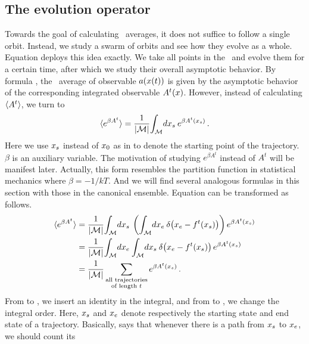 \subsection{The evolution operator}
\label{sec:eo}

Towards the goal of calculating \spt\ averages, it does not suffice to
follow a single orbit. Instead, we study a swarm of orbits and see how
they evolve as a whole.
Equation  deploys this idea exactly. We take all
points in the \statesp\ and evolve them for a certain time, after which
we study their overall asymptotic behavior.
By formula , the \spt\ average of observable
$a(x(t))$ is given by the asymptotic behavior of the corresponding
integrated observable $A^t(x)$.
However, instead of calculating $\langle {A^t} \rangle$, we turn to
\begin{equation}
  \label{eq:ave3}
    \langle {  e^{\beta A^t} } \rangle =
        {1 \over {|\ensuremath{\mathcal{M}}|}} {\int_{\mathcal{M}}{\!d x_s}\:}  e^{\beta A^t(x_s)}
    \,.
\end{equation}
Here we use $x_s$ instead of
$x_0$ as in  to denote the starting point of the
trajectory. $\beta$ is an auxiliary variable. The motivation of studying
$e^{\beta A^t}$ instead of $A^t$ will be manifest later. Actually, this
form resembles the partition function in statistical mechanics where
$\beta = -1/kT$. And we will find several analogous formulas in this
section with those in the canonical ensemble.
Equation  can be transformed as follows.
\begin{align}
    \langle {  e^{\beta A^t} } \rangle
  & = {1 \over {|\ensuremath{\mathcal{M}}|}} {\int_{\mathcal{M}}{\!d x_s}\:} \left(
    {\int_{\mathcal{M}}{\!d x_e}\:}
    \delta\negthinspace\left( {x_e - {f^{t}(x_s)}} \right) \right)e^{\beta A^t(x_s)} \label{eq:ave4} \\
  & = {1 \over {|\ensuremath{\mathcal{M}}|}} {\int_{\mathcal{M}}{\!d x_e}\:}
    {\int_{\mathcal{M}}{\!d x_s}\:}
    \delta\negthinspace\left( {x_e - {f^{t}(x_s)}} \right) e^{\beta A^t(x_s)} \label{eq:ave5} \\
  & = {1 \over {|\ensuremath{\mathcal{M}}|}}
    \sum_{\substack{\text{all trajectories} \\ \text{of length } t}} e^{\beta A^t(x_s)}
  \label{eq:ave6}
  \,.
\end{align}
From  to , we insert an identity in the integral,
and from  to , we change the integral order.
Here, $x_s$ and $x_e$ denote respectively the starting state
and end state of a trajectory. Basically,  says
that whenever there is a path from $x_s$ to $x_e$, we should count its
